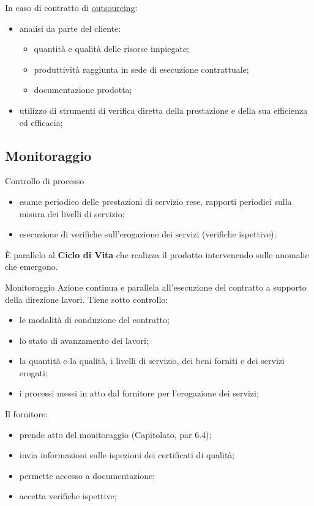 \documentclass{article}
\begin{document}
In caso di contratto di \hyperref[sub:ftt_outsourcing]{outsourcing}:
\begin{itemize}
    \item analisi da parte del cliente:
        \begin{itemize}
            \item quantità e qualità delle risorse impiegate;
            \item produttività raggiunta in sede di esecuzione contrattuale;
            \item documentazione prodotta;
        \end{itemize}
    \item utilizzo di strumenti di verifica diretta della prestazione e della sua efficienza ed efficacia;
\end{itemize}
%
\subsection{Monitoraggio}\label{sub:monitoraggio} %
\begin{definition}{Controllo di processo}{}
    \begin{itemize}
        \item esame periodico delle prestazioni di servizio rese, rapporti periodici sulla misura dei livelli di servizio;
        \item esecuzione di verifiche sull'erogazione dei servizi (verifiche ispettive);
    \end{itemize}
    È parallelo al \textbf{Ciclo di Vita} che realizza il prodotto intervenendo sulle anomalie che emergono.
\end{definition}
\begin{definition}{Monitoraggio}{}
    Azione continua e parallela all'esecuzione del contratto a supporto della direzione lavori.
    Tiene sotto controllo:
    \begin{itemize}
        \item le modalità di conduzione del contratto;
        \item lo stato di avanzamento dei lavori;
        \item la quantità e la qualità, i livelli di servizio, dei beni forniti e dei servizi erogati;
        \item i processi messi in atto dal fornitore per l'erogazione dei servizi;
    \end{itemize}
\end{definition}
\begin{note}
    Il fornitore:
    \begin{itemize}
        \item prende atto del monitoraggio (Capitolato, par 6.4);
        \item invia informazioni sulle ispezioni dei certificati di qualità;
        \item permette accesso a documentazione;
        \item accetta verifiche ispettive;
    \end{itemize}
\end{note}
\end{document}

